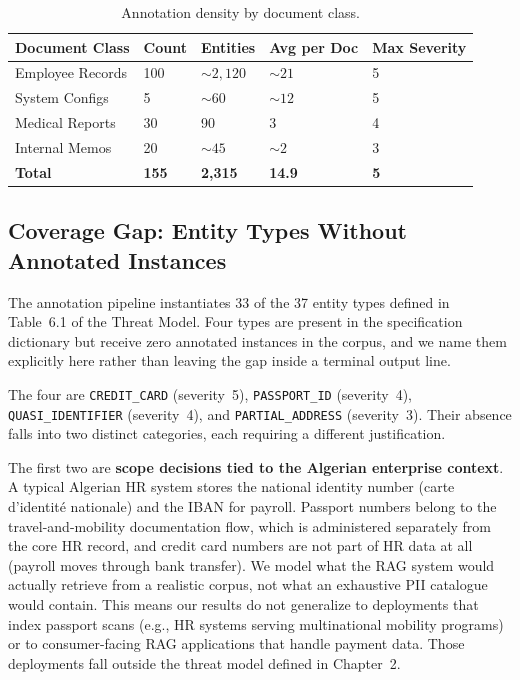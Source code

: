 \documentclass[12pt, a4paper]{article}
\begin{document}
\begin{table}[H]
\centering
\caption{Annotation density by document class.}
\label{tab:annotation-density}
\small
{}
\begin{tabular}{L{3.5cm} C{2cm} C{2cm} C{2.5cm} C{2.5cm}}
\toprule
{}
\color{white}\textbf{Document Class} &
\color{white}\textbf{Count} &
\color{white}\textbf{Entities} &
\color{white}\textbf{Avg per Doc} &
\color{white}\textbf{Max Severity} \\
\midrule
Employee Records & 100 & ${\sim}2{,}120$ & ${\sim}21$ & 5 \\
System Configs   & 5   & ${\sim}60$      & ${\sim}12$ & 5 \\
Medical Reports  & 30  & 90              & 3          & 4 \\
Internal Memos   & 20  & ${\sim}45$      & ${\sim}2$  & 3 \\
\midrule
\textbf{Total}   & \textbf{155} & \textbf{2{,}315} & \textbf{14.9} & \textbf{5} \\
\bottomrule
\end{tabular}
\end{table}

\subsection{Coverage Gap: Entity Types Without Annotated Instances}
\label{subsec:coverage-gap}

The annotation pipeline instantiates 33 of the 37 entity types defined in Table~6.1 of the Threat Model. Four types are present in the specification dictionary but receive zero annotated instances in the corpus, and we name them explicitly here rather than leaving the gap inside a terminal output line.

The four are \texttt{CREDIT\_CARD} (severity~5), \texttt{PASSPORT\_ID} (severity~4), \texttt{QUASI\_IDENTIFIER} (severity~4), and \texttt{PARTIAL\_ADDRESS} (severity~3). Their absence falls into two distinct categories, each requiring a different justification.

The first two are \textbf{scope decisions tied to the Algerian enterprise context}. A typical Algerian HR system stores the national identity number (carte d'identité nationale) and the IBAN for payroll. Passport numbers belong to the travel-and-mobility documentation flow, which is administered separately from the core HR record, and credit card numbers are not part of HR data at all (payroll moves through bank transfer). We model what the RAG system would actually retrieve from a realistic corpus, not what an exhaustive PII catalogue would contain. This means our results do not generalize to deployments that index passport scans (e.g., HR systems serving multinational mobility programs) or to consumer-facing RAG applications that handle payment data. Those deployments fall outside the threat model defined in Chapter~2.
\end{document}

